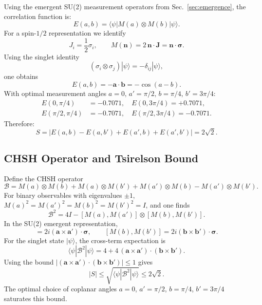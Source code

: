 ﻿\documentclass[11pt,a4paper]{article}
\begin{document}
Using the emergent SU(2) measurement operators from Sec.~\ref{sec:emergence}, the correlation function is:
\begin{equation}
E(a,b) = \langle\psi| M(a) \otimes M(b) |\psi\rangle.
\end{equation}
For a spin-$1/2$ representation we identify
\begin{equation}
J_i = \frac{1}{2} \sigma_i, \qquad M(\mathbf{n}) = 2\,\mathbf{n}\cdot\mathbf{J} = \mathbf{n}\cdot\boldsymbol{\sigma}.
\end{equation}
Using the singlet identity
\begin{equation}
(\sigma_i \otimes \sigma_j)|\psi\rangle = -\delta_{ij}|\psi\rangle,
\end{equation}
one obtains
\begin{equation}
E(a,b) = -\mathbf{a}\cdot\mathbf{b} = -\cos(a-b).
\end{equation}
With optimal measurement angles $a = 0$, $a' = \pi/2$, $b = \pi/4$, $b' = 3\pi/4$:
\begin{align}
E(0, \pi/4) &= -0.7071, \quad E(0, 3\pi/4) = +0.7071, \\
E(\pi/2, \pi/4) &= -0.7071, \quad E(\pi/2, 3\pi/4) = -0.7071.
\end{align}
Therefore:
\begin{equation}
S = |E(a,b) - E(a,b') + E(a',b) + E(a',b')| = 2\sqrt{2}.
\end{equation}

\subsection{CHSH Operator and Tsirelson Bound}

Define the CHSH operator
\begin{equation}
\mathcal{B} = M(a)\otimes M(b) + M(a)\otimes M(b') + M(a')\otimes M(b) - M(a')\otimes M(b').
\end{equation}
For binary observables with eigenvalues $\pm1$, $M(a)^2 = M(a')^2 = M(b)^2 = M(b')^2 = I$, and one finds
\begin{equation}
\mathcal{B}^2 = 4I - [M(a),M(a')]\otimes [M(b),M(b')].
\end{equation}
In the SU(2) emergent representation,
\begin{equation}
[M(a),M(a')] = 2i(\mathbf{a}\times\mathbf{a}')\cdot\boldsymbol{\sigma},
\qquad
[M(b),M(b')] = 2i(\mathbf{b}\times\mathbf{b}')\cdot\boldsymbol{\sigma}.
\end{equation}
For the singlet state $|\psi\rangle$, the cross-term expectation is
\begin{equation}
\langle\psi|\mathcal{B}^2|\psi\rangle = 4 + 4\, (\mathbf{a}\times\mathbf{a}')\cdot(\mathbf{b}\times\mathbf{b}').
\end{equation}
Using the bound $| (\mathbf{a}\times\mathbf{a}')\cdot(\mathbf{b}\times\mathbf{b}') | \le 1$ gives
\begin{equation}
|S| \le \sqrt{\langle\psi|\mathcal{B}^2|\psi\rangle} \le 2\sqrt{2}.
\end{equation}
The optimal choice of coplanar angles $a = 0$, $a' = \pi/2$, $b = \pi/4$, $b' = 3\pi/4$ saturates this bound.
\end{document}
